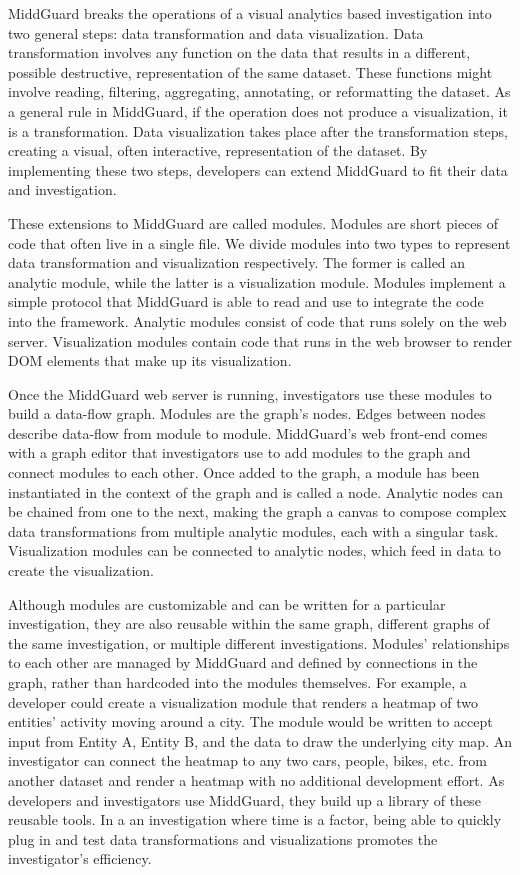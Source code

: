 \documentclass[midd]{thesis}
\begin{document}
MiddGuard breaks the operations of a visual analytics based investigation into
two general steps: data transformation and data visualization. Data
transformation involves any function on the data that results in a different,
possible destructive, representation of the same dataset. These functions might
involve reading, filtering, aggregating, annotating, or reformatting the
dataset. As a general rule in MiddGuard, if the operation does not produce a
visualization, it is a transformation. Data visualization takes place after the
transformation steps, creating a visual, often interactive, representation of
the dataset. By implementing these two steps, developers can extend MiddGuard to
fit their data and investigation.

These extensions to MiddGuard are called modules. Modules are short pieces of
code that often live in a single file. We divide modules into two types to
represent data transformation and visualization respectively. The former is
called an analytic module, while the latter is a visualization module. Modules
implement a simple protocol that MiddGuard is able to read and use to integrate
the code into the framework. Analytic modules consist of code that runs solely
on the web server. Visualization modules contain code that runs in the web
browser to render DOM elements that make up its visualization.

Once the MiddGuard web server is running, investigators use these modules to
build a data-flow graph. Modules are the graph's nodes. Edges between nodes
describe data-flow from module to module. MiddGuard's web front-end comes with a
graph editor that investigators use to add modules to the graph and connect
modules to each other. Once added to the graph, a module has been instantiated
in the context of the graph and is called a node. Analytic nodes can be chained
from one to the next, making the graph a canvas to compose complex data
transformations from multiple analytic modules, each with a singular task.
Visualization modules can be connected to analytic nodes, which feed in data to
create the visualization.

Although modules are customizable and can be written for a particular
investigation, they are also reusable within the same graph, different graphs of
the same investigation, or multiple different investigations. Modules'
relationships to each other are managed by MiddGuard and defined by connections
in the graph, rather than hardcoded into the modules themselves. For example, a
developer could create a visualization module that renders a heatmap of two
entities' activity moving around a city. The module would be written to accept
input from Entity A, Entity B, and the data to draw the underlying city map. An
investigator can connect the heatmap to any two cars, people, bikes, etc. from
another dataset and render a heatmap with no additional development effort. As
developers and investigators use MiddGuard, they build up a library of these
reusable tools. In a an investigation where time is a factor, being able to
quickly plug in and test data transformations and visualizations promotes the
investigator's efficiency.
\end{document}
